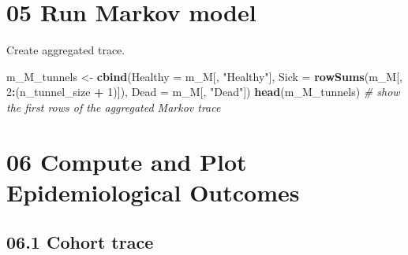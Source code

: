 \documentclass[
]{article}
\newenvironment{Shaded}{\begin{snugshade}}{\end{snugshade}}
\newcommand{\CommentTok}[1]{\textcolor[rgb]{0.56,0.35,0.01}{\textit{#1}}}
\newcommand{\ControlFlowTok}[1]{\textcolor[rgb]{0.13,0.29,0.53}{\textbf{#1}}}
\newcommand{\DataTypeTok}[1]{\textcolor[rgb]{0.13,0.29,0.53}{#1}}
\newcommand{\DecValTok}[1]{\textcolor[rgb]{0.00,0.00,0.81}{#1}}
\newcommand{\KeywordTok}[1]{\textcolor[rgb]{0.13,0.29,0.53}{\textbf{#1}}}
\newcommand{\NormalTok}[1]{#1}
\newcommand{\OperatorTok}[1]{\textcolor[rgb]{0.81,0.36,0.00}{\textbf{#1}}}
\newcommand{\StringTok}[1]{\textcolor[rgb]{0.31,0.60,0.02}{#1}}
\begin{document}
\hypertarget{run-markov-model}{%
\section{05 Run Markov model}\label{run-markov-model}}

\begin{Shaded}
\end{Shaded}

Create aggregated trace.

\begin{Shaded}
\begin{Highlighting}[]
\NormalTok{m_M_tunnels <-}\StringTok{ }\KeywordTok{cbind}\NormalTok{(}\DataTypeTok{Healthy =}\NormalTok{ m_M[, }\StringTok{"Healthy"}\NormalTok{], }
                \DataTypeTok{Sick =} \KeywordTok{rowSums}\NormalTok{(m_M[, }\DecValTok{2}\OperatorTok{:}\NormalTok{(n_tunnel_size }\OperatorTok{+}\StringTok{ }\DecValTok{1}\NormalTok{)]), }
                \DataTypeTok{Dead =}\NormalTok{ m_M[, }\StringTok{"Dead"}\NormalTok{])}
\KeywordTok{head}\NormalTok{(m_M_tunnels) }\CommentTok{# show the first rows of the aggregated Markov trace}
\end{Highlighting}
\end{Shaded}

\hypertarget{compute-and-plot-epidemiological-outcomes}{%
\section{06 Compute and Plot Epidemiological
Outcomes}\label{compute-and-plot-epidemiological-outcomes}}

\hypertarget{cohort-trace-1}{%
\subsection{06.1 Cohort trace}\label{cohort-trace-1}}
\end{document}
